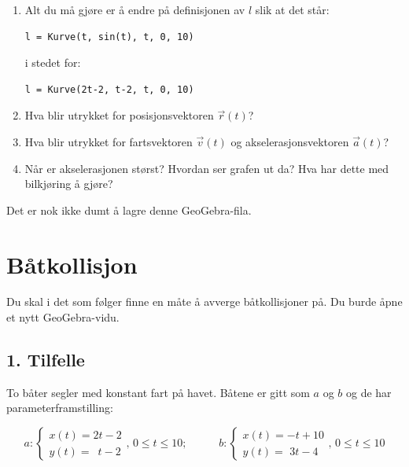 \documentclass[a4paper,12pt]{article}
\begin{document}
\begin{enumerate}[label=\alph*)]
\item Alt du må gjøre er å endre på definisjonen av $l$ slik at det står:
\begin{lstlisting}
l = Kurve(t, sin(t), t, 0, 10)
\end{lstlisting}
i stedet for:
\begin{lstlisting}
l = Kurve(2t-2, t-2, t, 0, 10)
\end{lstlisting}

\item Hva blir utrykket for posisjonsvektoren $\vec r(t)$?
\item Hva blir utrykket for fartsvektoren $\vec v(t)$ og akselerasjonsvektoren $\vec a(t)$?

\item Når er akselerasjonen størst? Hvordan ser grafen ut da? Hva har dette med bilkjøring å gjøre?

\end{enumerate}

Det er nok ikke dumt å lagre denne GeoGebra-fila.

\section*{Båtkollisjon}
Du skal i det som følger finne en måte å avverge båtkollisjoner på. Du burde åpne et nytt GeoGebra-vidu.

\subsection*{1. Tilfelle}
To båter segler med konstant fart på havet. Båtene er gitt som $a$ og $b$ og de har parameterframstilling:

\[
a:
\begin{cases}
x(t)=2t - 2 \\
y(t)=\phantom{2}t-2
\end{cases},\, 0 \leq t \leq 10; \,\,\,\,\,\,\,\,\,\,\,\,\,\,\,\,\, b:
\begin{cases}
x(t)=-t + 10 \\
y(t)=\,\,3t-4
\end{cases},\, 0 \leq t \leq 10
\]
\end{document}
